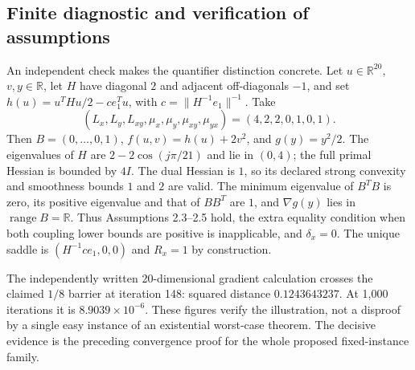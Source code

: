 \documentclass[10pt]{article}
\begin{document}
\subsection*{Finite diagnostic and verification of assumptions}
An independent check makes the quantifier distinction concrete. Let \(u\in\mathbb R^{20}\), \(v,y\in\mathbb R\), let \(H\) have diagonal \(2\) and adjacent off-diagonals \(-1\), and set \(h(u)=u^THu/2-c e_1^Tu\), with \(c=\|H^{-1}e_1\|^{-1}\). Take \[(L_x,L_y,L_{xy},\mu_x,\mu_y,\mu_{xy},\mu_{yx})=(4,2,2,0,1,0,1).\] Then \(B=(0,\ldots,0,1)\), \(f(u,v)=h(u)+2v^2\), and \(g(y)=y^2/2\). The eigenvalues of \(H\) are \(2-2\cos(j\pi/21)\) and lie in \((0,4)\); the full primal Hessian is bounded by \(4I\). The dual Hessian is \(1\), so its declared strong convexity and smoothness bounds \(1\) and \(2\) are valid. The minimum eigenvalue of \(B^TB\) is zero, its positive eigenvalue and that of \(BB^T\) are \(1\), and \(\nabla g(y)\) lies in \(\operatorname{range}B=\mathbb R\). Thus Assumptions 2.3–2.5 hold, the extra equality condition when both coupling lower bounds are positive is inapplicable, and \(\delta_x=0\). The unique saddle is \((H^{-1}ce_1,0,0)\) and \(R_x=1\) by construction.\par
The independently written 20-dimensional gradient calculation crosses the claimed \(1/8\) barrier at iteration 148: squared distance \(0.1243643237\). At 1,000 iterations it is \(8.9039\times10^{-6}\). These figures verify the illustration, not a disproof by a single easy instance of an existential worst-case theorem. The decisive evidence is the preceding convergence proof for the whole proposed fixed-instance family.\par
\end{document}
